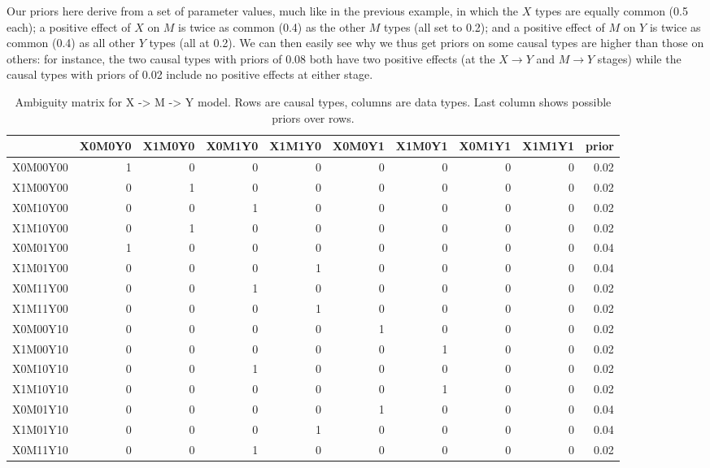 \documentclass[12pt,]{book}
\begin{document}
Our priors here derive from a set of parameter values, much like in the previous example, in which the \(X\) types are equally common (0.5 each); a positive effect of \(X\) on \(M\) is twice as common (0.4) as the other \(M\) types (all set to 0.2); and a positive effect of \(M\) on \(Y\) is twice as common (0.4) as all other \(Y\) types (all at 0.2). We can then easily see why we thus get priors on some causal types are higher than those on others: for instance, the two causal types with priors of 0.08 both have two positive effects (at the \(X \rightarrow Y\) and \(M \rightarrow Y\) stages) while the causal types with priors of 0.02 include no positive effects at either stage.

\begin{table}[t]

\caption{\label{tab:unnamed-chunk-26}Ambiguity matrix for X -> M -> Y model. Rows are causal types, columns are data types. Last column shows possible priors over rows.}
\centering
\begin{tabular}{l|r|r|r|r|r|r|r|r|r}
\hline
  & X0M0Y0 & X1M0Y0 & X0M1Y0 & X1M1Y0 & X0M0Y1 & X1M0Y1 & X0M1Y1 & X1M1Y1 & prior\\
\hline
X0M00Y00 & 1 & 0 & 0 & 0 & 0 & 0 & 0 & 0 & 0.02\\
\hline
X1M00Y00 & 0 & 1 & 0 & 0 & 0 & 0 & 0 & 0 & 0.02\\
\hline
X0M10Y00 & 0 & 0 & 1 & 0 & 0 & 0 & 0 & 0 & 0.02\\
\hline
X1M10Y00 & 0 & 1 & 0 & 0 & 0 & 0 & 0 & 0 & 0.02\\
\hline
X0M01Y00 & 1 & 0 & 0 & 0 & 0 & 0 & 0 & 0 & 0.04\\
\hline
X1M01Y00 & 0 & 0 & 0 & 1 & 0 & 0 & 0 & 0 & 0.04\\
\hline
X0M11Y00 & 0 & 0 & 1 & 0 & 0 & 0 & 0 & 0 & 0.02\\
\hline
X1M11Y00 & 0 & 0 & 0 & 1 & 0 & 0 & 0 & 0 & 0.02\\
\hline
X0M00Y10 & 0 & 0 & 0 & 0 & 1 & 0 & 0 & 0 & 0.02\\
\hline
X1M00Y10 & 0 & 0 & 0 & 0 & 0 & 1 & 0 & 0 & 0.02\\
\hline
X0M10Y10 & 0 & 0 & 1 & 0 & 0 & 0 & 0 & 0 & 0.02\\
\hline
X1M10Y10 & 0 & 0 & 0 & 0 & 0 & 1 & 0 & 0 & 0.02\\
\hline
X0M01Y10 & 0 & 0 & 0 & 0 & 1 & 0 & 0 & 0 & 0.04\\
\hline
X1M01Y10 & 0 & 0 & 0 & 1 & 0 & 0 & 0 & 0 & 0.04\\
\hline
X0M11Y10 & 0 & 0 & 1 & 0 & 0 & 0 & 0 & 0 & 0.02\\

\end{tabular}
\end{table}
\end{document}
